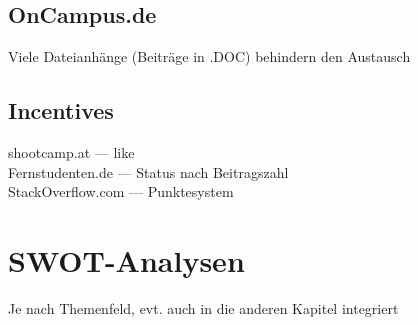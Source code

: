 \subsection{OnCampus.de} %
\label{sub:oncampus_de}
Viele Dateianhänge (Beiträge in .DOC) behindern den Austausch

\subsection{Incentives} %
\label{sub:infentives}
shootcamp.at --- like\\
Fernstudenten.de --- Status nach Beitragszahl\\
StackOverflow.com --- Punktesystem


\section{SWOT-Analysen} %
\label{sec:swot_analysen}
Je nach  Themenfeld, evt. auch in die anderen Kapitel integriert
